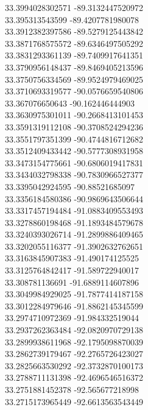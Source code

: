 {33.3994028302571	-89.3132447520972\\
33.395313543599	-89.4207781980078\\
33.3912382397586	-89.5279125443842\\
33.3871768575572	-89.6346497505292\\
33.3831293361139	-89.7409917641351\\
33.3790956148437	-89.8469405213596\\
33.3750756334569	-89.9524979469025\\
33.3710693319577	-90.0576659540806\\
33.367076650643	-90.162446444903\\
33.3630975301011	-90.2668413101453\\
33.3591319112108	-90.3708524294236\\
33.3551797351399	-90.4744816712682\\
33.3512409433442	-90.5777308931958\\
33.3473154775661	-90.6806019417831\\
33.3434032798338	-90.7830966527377\\
33.3395042924595	-90.88521685097\\
33.3356184580386	-90.9869643506644\\
33.3317457194484	-91.0883409553493\\
33.3278860198468	-91.1893484579678\\
33.3240393026714	-91.2899886409465\\
33.3202055116377	-91.3902632762651\\
33.3163845907383	-91.490174125525\\
33.3125764842417	-91.589722940017\\
33.308781136691	-91.6889114607896\\
33.3049984929025	-91.7877414187158\\
33.3012284979646	-91.8862145345599\\
33.2974710972369	-91.984332519044\\
33.2937262363484	-92.0820970729138\\
33.2899938611968	-92.1795098870039\\
33.2862739179467	-92.2765726423027\\
33.2825663530292	-92.3732870100173\\
33.2788711131398	-92.4696546516372\\
33.2751881452378	-92.565677218998\\
33.2715173965449	-92.6613563543449\\
}
